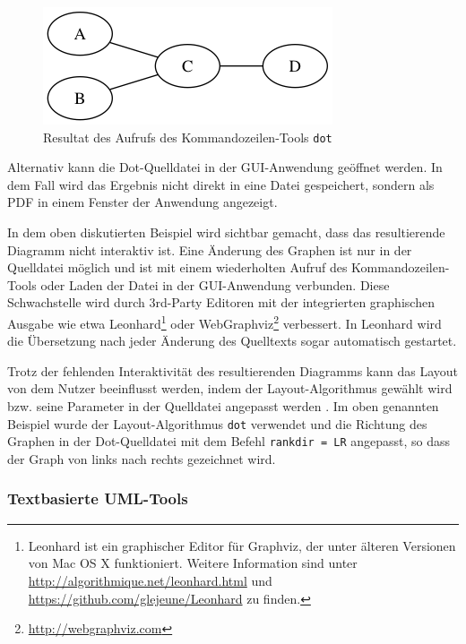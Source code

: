 

\begin{figure}[hbt]
    \centering
    \includegraphics[scale=0.75]{resources/graphviz-dot-example.png}
    \caption{Resultat des Aufrufs des Kommandozeilen-Tools \lstinline{dot}}
    \label{fig:graphviz-dot-example}
\end{figure}

Alternativ kann die Dot-Quelldatei in der GUI-Anwendung geöffnet werden. In dem Fall wird das Ergebnis nicht direkt in eine Datei gespeichert, sondern als PDF in einem Fenster der Anwendung angezeigt.

In dem oben diskutierten Beispiel wird sichtbar gemacht, dass das resultierende Diagramm nicht interaktiv ist. Eine Änderung des Graphen ist nur in der Quelldatei möglich und ist mit einem wiederholten Aufruf des Kommandozeilen-Tools oder Laden der Datei in der GUI-Anwendung verbunden. Diese Schwachstelle wird durch 3rd-Party Editoren mit der integrierten graphischen Ausgabe wie etwa Leonhard\footnote{Leonhard ist ein graphischer Editor für Graphviz, der unter älteren Versionen von Mac OS X funktioniert. Weitere Information sind unter \url{http://algorithmique.net/leonhard.html} und \url{https://github.com/glejeune/Leonhard} zu finden.} oder WebGraphviz\footnote{\url{http://webgraphviz.com}} verbessert. In Leonhard wird die Übersetzung nach jeder Änderung des Quelltexts sogar automatisch gestartet.

Trotz der fehlenden Interaktivität des resultierenden Diagramms kann das Layout von dem Nutzer beeinflusst werden, indem der Layout-Algorithmus gewählt wird bzw. seine Parameter in der Quelldatei angepasst werden \cite{NorthGansner14Dot-Manual}. Im oben genannten Beispiel wurde der Layout-Algorithmus \lstinline{dot} verwendet und die Richtung des Graphen in der Dot-Quelldatei mit dem Befehl \lstinline{rankdir = LR} angepasst, so dass der Graph von links nach rechts gezeichnet wird.

\subsubsection{Textbasierte UML-Tools}

